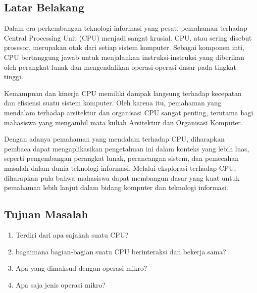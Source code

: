 \subsection{Latar Belakang}

Dalam era perkembangan teknologi informasi yang pesat, pemahaman terhadap
Central Processing Unit (CPU) menjadi sangat krusial. CPU, atau sering
disebut prosesor, merupakan otak dari setiap sistem komputer. Sebagai komponen inti,
CPU bertanggung jawab untuk menjalankan instruksi-instruksi yang diberikan
oleh perangkat lunak dan mengendalikan operasi-operasi dasar pada tingkat tinggi.

Kemampuan dan kinerja CPU memiliki dampak langsung terhadap kecepatan dan
efisiensi suatu sistem komputer. Oleh karena itu, pemahaman yang mendalam
terhadap arsitektur dan organisasi CPU sangat penting, terutama bagi mahasiswa
yang mengambil mata kuliah Arsitektur dan Organisasi Komputer.

Dengan adanya pemahaman yang mendalam terhadap CPU, diharapkan pembaca
dapat mengaplikasikan pengetahuan ini dalam konteks yang lebih luas,
seperti pengembangan perangkat lunak, perancangan sistem, dan pemecahan
masalah dalam dunia teknologi informasi. Melalui eksplorasi terhadap CPU,
diharapkan pula bahwa mahasiswa dapat membangun dasar yang kuat untuk pemahaman
lebih lanjut dalam bidang komputer dan teknologi informasi.

\subsection{Tujuan Masalah}

\begin{enumerate}[label=\alph*.]
  \item Terdiri dari apa sajakah suatu CPU?
  \item bagaimana bagian-bagian suatu CPU berinteraksi dan bekerja sama?
  \item Apa yang dimaksud dengan operasi mikro?
  \item Apa saja jenis operasi mikro?
\end{enumerate}
